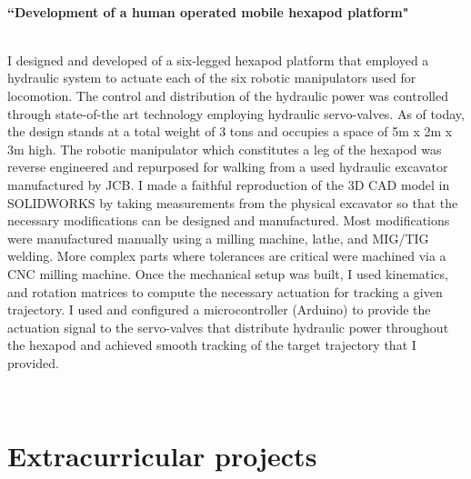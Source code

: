 \documentclass[12pt]{article} %
\begin{document}
{	
	~
	~
	~
	~

	\medskip %

	{\raggedright\textbf{``Development of a human operated mobile hexapod platform"}}\\
	I designed and developed of a six-legged hexapod platform that employed a hydraulic system to actuate each of the six robotic manipulators used for locomotion. The control and distribution of the hydraulic power was controlled through state-of-the art technology employing hydraulic servo-valves. As of today, the design stands at a total weight of 3 tons and occupies a space of 5m x 2m x 3m high. The robotic manipulator which constitutes a leg of the hexapod was reverse engineered and repurposed for walking from a used hydraulic excavator manufactured by JCB. I made a faithful reproduction of the 3D CAD model in SOLIDWORKS by taking measurements from the physical excavator so that the necessary modifications can be designed and manufactured. Most modifications were manufactured manually using a milling machine, lathe, and MIG/TIG welding. More complex parts where tolerances are critical were machined via a CNC milling machine. Once the mechanical setup was built, I used kinematics, and rotation matrices to compute the necessary actuation for tracking a given trajectory. I used and configured a microcontroller (Arduino) to provide the actuation signal to the servo-valves that distribute hydraulic power throughout the hexapod and achieved smooth tracking of the target trajectory that I provided.

	~
	~
	~
	~
	~


	\section{Extracurricular projects}

}
\end{document}
